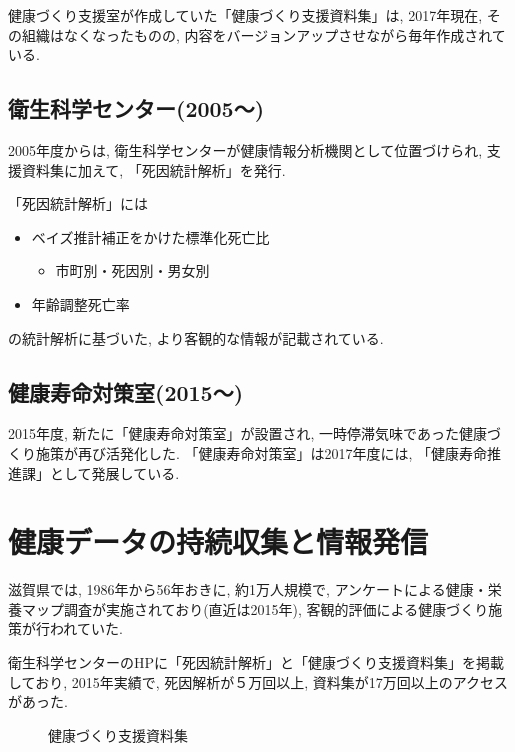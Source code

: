 健康づくり支援室が作成していた「健康づくり支援資料集」は, 2017年現在, その組織はなくなったものの,
内容をバージョンアップさせながら毎年作成されている.

\subsection{衛生科学センター(2005〜)}

2005年度からは, 衛生科学センターが健康情報分析機関として位置づけられ, 支援資料集に加えて,
「死因統計解析」を発行.

「死因統計解析」には
\begin{itemize} \setlength{\itemsep}{-0.5mm} \setlength{\parskip}{-0.5mm}
	\item ベイズ推計補正をかけた標準化死亡比
	      \begin{itemize} \setlength{\itemsep}{-0.5mm} \setlength{\parskip}{-0.5mm}
		      \item 市町別・死因別・男女別
	      \end{itemize}
	\item 年齢調整死亡率
\end{itemize}
の統計解析に基づいた, より客観的な情報が記載されている.

\subsection{健康寿命対策室(2015〜)}
2015年度, 新たに「健康寿命対策室」が設置され, 一時停滞気味であった健康づくり施策が再び活発化した. 	「健康寿命対策室」は2017年度には, 「健康寿命推進課」として発展している.

\section{健康データの持続収集と情報発信}
滋賀県では, 1986年から56年おきに, 約1万人規模で, アンケートによる健康・栄養マップ調査が実施されており(直近は2015年), 客観的評価による健康づくり施策が行われていた.

衛生科学センターのHPに「死因統計解析」と「健康づくり支援資料集」を掲載しており, 2015年実績で, 死因解析が５万回以上, 資料集が17万回以上のアクセスがあった.
\begin{figure}[h!]
	\begin{center}
		\caption{健康づくり支援資料集}\label{fig1}
	\end{center}
\end{figure}




